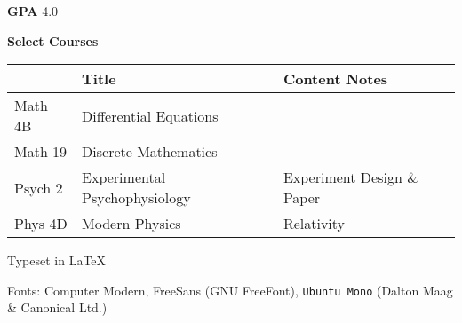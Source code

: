 \documentclass[11pt]{article}
\newcommand{\myKey}[1]{{\color{keyColor}\textbf{#1}}}
\begin{document}
\myKey{GPA} 4.0

\myKey{Select Courses}

\begin{tabular}{l l l}
\hline
 & Title & Content Notes \\
\hline
\rowcolor{oddColor} Math 4B & Differential Equations & \\
\rowcolor{oddColor} Math 19 & Discrete Mathematics & \\
\rowcolor{oddColor}
Psych 2 & Experimental Psychophysiology & Experiment Design \& Paper \\
\rowcolor{oddColor} Phys 4D & Modern Physics & Relativity \\
\hline
\end{tabular}

\vspace{1cm}

{
\begin{center}
\color{gray}
Typeset in \LaTeX\

Fonts: Computer Modern, \textsf{FreeSans} (GNU FreeFont),
\texttt{Ubuntu Mono} (Dalton Maag \& Canonical Ltd.)
\end{center}
}
\end{document}
